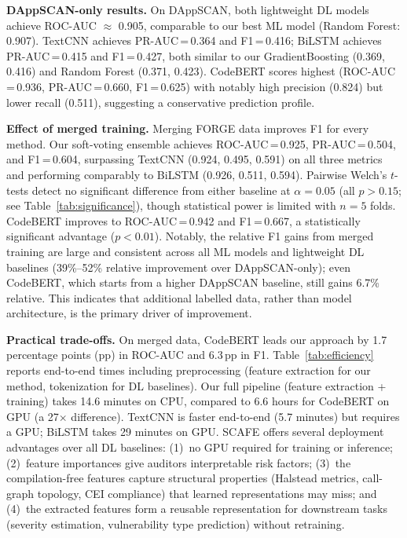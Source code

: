 \documentclass[11pt,a4paper]{article}
\newcommand{\MethodName}{SCAFE\xspace}
\begin{document}
\textbf{DAppSCAN-only results.}
On DAppSCAN, both lightweight DL models achieve ROC-AUC $\approx$ 0.905, comparable to our best ML model (Random Forest: 0.907).
TextCNN achieves PR-AUC\,=\,0.364 and F1\,=\,0.416; BiLSTM achieves PR-AUC\,=\,0.415 and F1\,=\,0.427, both similar to our GradientBoosting (0.369, 0.416) and Random Forest (0.371, 0.423).
CodeBERT scores highest (ROC-AUC\,=\,0.936, PR-AUC\,=\,0.660, F1\,=\,0.625) with notably high precision (0.824) but lower recall (0.511), suggesting a conservative prediction profile.

\textbf{Effect of merged training.}
Merging FORGE data improves F1 for every method.
Our soft-voting ensemble achieves ROC-AUC\,=\,0.925, PR-AUC\,=\,0.504, and F1\,=\,0.604, surpassing TextCNN (0.924, 0.495, 0.591) on all three metrics and performing comparably to BiLSTM (0.926, 0.511, 0.594).
Pairwise Welch's $t$-tests detect no significant difference from either baseline at $\alpha = 0.05$ (all $p > 0.15$; see Table~\ref{tab:significance}), though statistical power is limited with $n = 5$ folds.
CodeBERT improves to ROC-AUC\,=\,0.942 and F1\,=\,0.667, a statistically significant advantage ($p < 0.01$).
Notably, the relative F1 gains from merged training are large and consistent across all ML models and lightweight DL baselines (39\%--52\% relative improvement over DAppSCAN-only); even CodeBERT, which starts from a higher DAppSCAN baseline, still gains 6.7\% relative.
This indicates that additional labelled data, rather than model architecture, is the primary driver of improvement.

\textbf{Practical trade-offs.}
On merged data, CodeBERT leads our approach by 1.7 percentage points (pp) in ROC-AUC and 6.3\,pp in F1.
Table~\ref{tab:efficiency} reports end-to-end times including preprocessing (feature extraction for our method, tokenization for DL baselines).
Our full pipeline (feature extraction + training) takes 14.6 minutes on CPU, compared to 6.6 hours for CodeBERT on GPU (a 27$\times$ difference).
TextCNN is faster end-to-end (5.7 minutes) but requires a GPU; BiLSTM takes 29 minutes on GPU.
\MethodName offers several deployment advantages over all DL baselines:
(1)~no GPU required for training or inference;
(2)~feature importances give auditors interpretable risk factors;
(3)~the compilation-free features capture structural properties (Halstead metrics, call-graph topology, CEI compliance) that learned representations may miss;
and (4)~the extracted features form a reusable representation for downstream tasks (severity estimation, vulnerability type prediction) without retraining.
\end{document}
